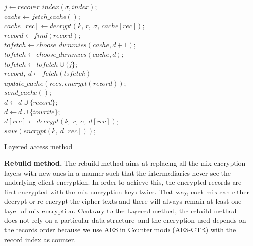 \documentclass[USenglish,oneside,twocolumn]{article}
\begin{document}
\begin{algorithm}
\DontPrintSemicolon
{}
$j \gets recover\_index(\sigma, index)$;\\
$cache \gets fetch\_cache()$;\\
{
$cache[rec]\gets decrypt(k,\ r,\ \sigma,\ cache[rec])$;\\
}
{
$record \gets find(record) $;\\
$tofetch \gets choose\_dummies(cache, d+1)$;\\
}
\Else
{
$tofetch \gets choose\_dummies(cache, d)$;\\
$tofetch \gets tofetch \cup \{j\}$;\\
}
$record,\ d \gets fetch(tofetch)$\\
$update\_cache(recs, encrypt(record))$;\\
$send\_cache()$;\\
{
$d \gets d \cup \{record\}$;\\
}
\Else
{
$d \gets d \cup \{towrite\}$;\\
}
{
$d[rec] \gets decrypt(k,\ r,\ \sigma,\ d[rec])$;\\
$save(encrypt(k,\ d[rec]))$;\\
}
\caption{Layered access method}
\label{alg:lacc}
\end{algorithm}

\noindent\textbf{Rebuild method.} The rebuild method aims at replacing all the mix encryption layers with new ones in a manner such that the intermediaries never see the underlying client encryption. In order to achieve this, the encrypted records are first encrypted with the mix encryption keys twice. That way, each mix can either decrypt or re-encrypt the cipher-texts and there will always remain at least one layer of  mix encryption. Contrary to the Layered method, the rebuild method does not rely on a particular data structure, and the encryption used depends on the records order because we use AES in Counter mode (AES-CTR) with the record index as counter.
\end{document}
